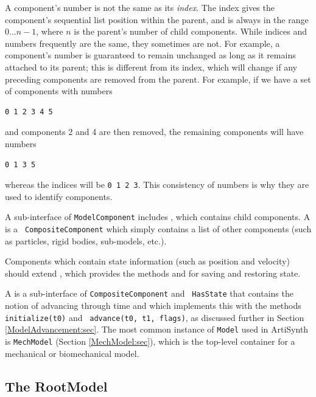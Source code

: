\begin{sideblock}
A component's number is not the same as its {\it index}.  The index
gives the component's sequential list position within the parent, and
is always in the range $0 \ldots n-1$, where $n$ is the parent's
number of child components. While indices and numbers frequently are
the same, they sometimes are not. For example, a component's number is
guaranteed to remain unchanged as long as it remains attached to its
parent; this is different from its index, which will change if any
preceding components are removed from the parent. For example, if we
have a set of components with numbers
%
\begin{verbatim}
0 1 2 3 4 5
\end{verbatim}
%
and components 2 and 4 are then removed, the remaining components will
have numbers
%
\begin{verbatim}
0 1 3 5
\end{verbatim}
%
whereas the indices will be {\tt 0 1 2 3}. This consistency of
numbers is why they are used to identify components.
\end{sideblock}

A sub-interface of {\tt ModelComponent} includes
, which
contains child components.  A
 is a {\tt
CompositeComponent} which simply contains a list of other components
(such as particles, rigid bodies, sub-models, etc.).

Components which contain state information (such as position and
velocity) should extend 
, 
which provides the methods
and
for saving and restoring state.

A
is a sub-interface of {\tt CompositeComponent} and {\tt
HasState} that contains the notion of advancing through time and which
implements this with the methods {\tt initialize(t0)} and {\tt
advance(t0, t1, flags)}, as discussed further in
Section \ref{ModelAdvancement:sec}.
The most common instance of {\tt Model} used
in ArtiSynth is {\tt MechModel} (Section \ref{MechModel:sec}), which
is the top-level container for a mechanical or biomechanical model.

\subsection{The RootModel}
\label{RootModel:sec}

